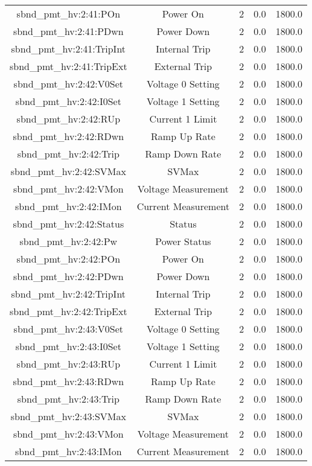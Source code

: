\begin{center}
\begin{longtable}{c | c c c c }
sbnd\_pmt\_hv:2:41:POn & Power On & 2 & 0.0 & 1800.0\\ 
sbnd\_pmt\_hv:2:41:PDwn & Power Down & 2 & 0.0 & 1800.0\\ 
sbnd\_pmt\_hv:2:41:TripInt & Internal Trip & 2 & 0.0 & 1800.0\\ 
sbnd\_pmt\_hv:2:41:TripExt & External Trip & 2 & 0.0 & 1800.0\\ 
sbnd\_pmt\_hv:2:42:V0Set & Voltage 0 Setting & 2 & 0.0 & 1800.0\\ 
sbnd\_pmt\_hv:2:42:I0Set & Voltage 1 Setting & 2 & 0.0 & 1800.0\\ 
sbnd\_pmt\_hv:2:42:RUp & Current 1 Limit & 2 & 0.0 & 1800.0\\ 
sbnd\_pmt\_hv:2:42:RDwn & Ramp Up Rate & 2 & 0.0 & 1800.0\\ 
sbnd\_pmt\_hv:2:42:Trip & Ramp Down Rate & 2 & 0.0 & 1800.0\\ 
sbnd\_pmt\_hv:2:42:SVMax & SVMax & 2 & 0.0 & 1800.0\\ 
sbnd\_pmt\_hv:2:42:VMon & Voltage Measurement & 2 & 0.0 & 1800.0\\ 
sbnd\_pmt\_hv:2:42:IMon & Current Measurement & 2 & 0.0 & 1800.0\\ 
sbnd\_pmt\_hv:2:42:Status & Status & 2 & 0.0 & 1800.0\\ 
sbnd\_pmt\_hv:2:42:Pw & Power Status & 2 & 0.0 & 1800.0\\ 
sbnd\_pmt\_hv:2:42:POn & Power On & 2 & 0.0 & 1800.0\\ 
sbnd\_pmt\_hv:2:42:PDwn & Power Down & 2 & 0.0 & 1800.0\\ 
sbnd\_pmt\_hv:2:42:TripInt & Internal Trip & 2 & 0.0 & 1800.0\\ 
sbnd\_pmt\_hv:2:42:TripExt & External Trip & 2 & 0.0 & 1800.0\\ 
sbnd\_pmt\_hv:2:43:V0Set & Voltage 0 Setting & 2 & 0.0 & 1800.0\\ 
sbnd\_pmt\_hv:2:43:I0Set & Voltage 1 Setting & 2 & 0.0 & 1800.0\\ 
sbnd\_pmt\_hv:2:43:RUp & Current 1 Limit & 2 & 0.0 & 1800.0\\ 
sbnd\_pmt\_hv:2:43:RDwn & Ramp Up Rate & 2 & 0.0 & 1800.0\\ 
sbnd\_pmt\_hv:2:43:Trip & Ramp Down Rate & 2 & 0.0 & 1800.0\\ 
sbnd\_pmt\_hv:2:43:SVMax & SVMax & 2 & 0.0 & 1800.0\\ 
sbnd\_pmt\_hv:2:43:VMon & Voltage Measurement & 2 & 0.0 & 1800.0\\ 
sbnd\_pmt\_hv:2:43:IMon & Current Measurement & 2 & 0.0 & 1800.0\\ 

\end{longtable}
\end{center}
